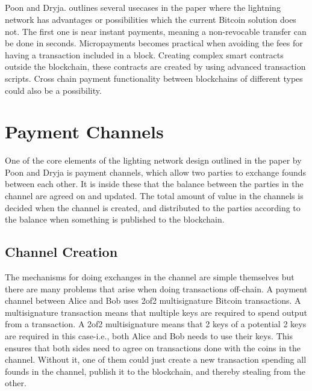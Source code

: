 \documentclass[informationsecurity]{gucmasterproject}
\begin{document}
\paragraph{}
Poon and Dryja. outlines several usecases in the paper \cite{poon2015bitcoin} where the lightning network has advantages or possibilities which the current Bitcoin solution does not. The first one is near instant payments, meaning a non-revocable transfer can be done in seconds. Micropayments becomes practical when avoiding the fees for having a transaction included in a block. Creating complex smart contracts outside the blockchain, these contracts are created by using advanced transaction scripts. Cross chain payment functionality between blockchains of different types could also be a possibility.



\chapter{Payment Channels}

\cite{decker2015fast}

One of the core elements of the lighting network design outlined in the paper by Poon and Dryja \cite{poon2015bitcoin} is payment channels, which allow two parties to exchange founds between each other.
It is inside these that the balance between the parties in the channel are agreed on and updated.
The total amount of value in the channels is decided when the channel is created, and distributed to the parties according to the balance when something is published to the blockchain.


\section{Channel Creation}

The mechanisms for doing exchanges in the channel are simple themselves but there are many problems that arise when doing transactions off-chain.
A payment channel between Alice and Bob uses 2of2 multisignature Bitcoin transactions. A multisignature transaction means that multiple keys are required to spend output from a transaction. A 2of2 multisignature means that 2 keys of a potential 2 keys are required in this case-i.e., both Alice and Bob needs to use their keys. This ensures that both sides need to agree on transactions done with the coins in the channel. Without it, one of them could just create a new transaction spending all founds in the channel, publish it to the blockchain, and thereby stealing from the other.
\end{document}
